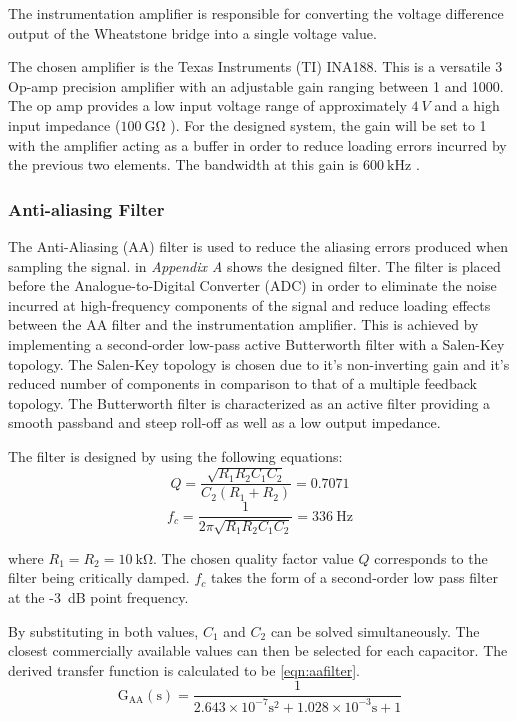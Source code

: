 \documentclass[10pt,twocolumn]{witseiepaper}
\begin{document}
The instrumentation amplifier is responsible for converting the voltage difference output of the Wheatstone bridge into a single voltage value.

The chosen amplifier is the Texas Instruments (TI) INA188. This is a versatile 3 Op-amp precision amplifier with an adjustable gain ranging between 1 and 1000. The op amp provides a low input voltage range of approximately $4~V$ and a high input impedance ($100~\mathrm{G\Omega}$ \cite{ina188}). For the designed system, the gain will be set to 1 with the amplifier acting as a buffer in order to reduce loading errors incurred by the previous two elements. The bandwidth at this gain is $600~\mathrm{kHz}$ \cite{ina188}.

\subsubsection{Anti-aliasing Filter}

The Anti-Aliasing (AA) filter is used to reduce the aliasing errors produced when sampling the signal.  in \textit{Appendix A} shows the designed filter. The filter is placed before the Analogue-to-Digital Converter (ADC) in order to eliminate the noise incurred at high-frequency components of the signal and reduce loading effects between the AA filter and the instrumentation amplifier. This is achieved by implementing a second-order low-pass active Butterworth filter with a Salen-Key topology. The Salen-Key topology is chosen due to it's non-inverting gain and it's reduced number of components in comparison to that of a multiple feedback topology. The Butterworth filter is characterized as an active filter providing a smooth passband and steep roll-off as well as a low output impedance.

The filter is designed by using the following equations:
\begin{equation}
Q = \frac{\sqrt{R_1 R_2 C_1 C_2}}{C_2 (R_1 + R_2)} = 0.7071	
\end{equation}
\begin{equation}
f_c = \frac{1}{2 \pi \sqrt{R_1 R_2 C_1 C_2}} = 336~\mathrm{Hz}
\end{equation}

where $R_1 = R_2 = 10~\mathrm{k\Omega}$. The chosen quality factor value $Q$ corresponds to the filter being critically damped. $f_c$ takes the form of a second-order low pass filter at the -3~dB point frequency.

By substituting in both values, $C_1$ and $C_2$ can be solved simultaneously. The closest commercially available values can then be selected for each capacitor. The derived transfer function is calculated to be \cref{eqn:aafilter}.
\begin{equation}
\mathrm{G_{AA}(s) = \frac{1}{2.643 \times 10^{-7} s^2 + 1.028 \times 10^{-3} s + 1} }
\label{eqn:aafilter}
\end{equation}
\end{document}
